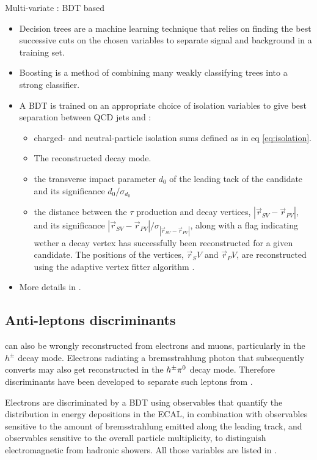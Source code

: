 Multi-variate : BDT based
\begin{itemize}
    \item Decision trees are a machine learning technique that relies on finding the best successive cuts on the chosen variables to separate signal and background in a training set.
    \item Boosting is a method of combining many weakly classifying trees into a strong classifier.
    \item A BDT is trained on an appropriate choice of isolation variables to give best separation between QCD jets and \tauh : 
    \begin{itemize}
        \item charged- and neutral-particle isolation sums defined as in eq \ref{eq:isolation}.
        \item The reconstructed decay mode.
        \item the transverse impact parameter $d_0$ of the leading tack of the \tauh candidate and its significance $d_0 / \sigma_{d_0}$
        \item the distance between the $\tau$ production and decay vertices, $|\Vec{r}_{SV} - \Vec{r}_{PV}|$, and its significance $|\Vec{r}_{SV} - \Vec{r}_{PV}|/\sigma_{|\Vec{r}_{SV} - \Vec{r}_{PV}|}$, along with a flag indicating wether a decay vertex has successfully been reconstructed for a given \tauh candidate. The positions of the vertices, $\Vec{r}_SV$ and $\Vec{r}_PV$, are reconstructed using the adaptive vertex fitter algorithm \cite{Waltenberger_2007}.
    \end{itemize}
    \item More details in \cite{tauh_reconstruction}.
\end{itemize}

\subsection{Anti-leptons discriminants}

\tauh can also be wrongly reconstructed from electrons and muons, particularly in the $h^{\pm}$ decay mode. Electrons radiating a bremsstrahlung photon that subsequently converts may also get reconstructed in the $h^{\pm}\pi^{0}$ decay mode. Therefore discriminants have been developed to separate such leptons from \tauh.

Electrons are discriminated by a BDT using observables that quantify the distribution in energy depositions in the ECAL, in combination with observables sensitive to the amount of bremsstrahlung emitted along the leading track, and observables sensitive to the overall particle multiplicity, to distinguish electromagnetic from hadronic showers.
All those variables are listed in \cite{tauh_reconstruction}.
    
